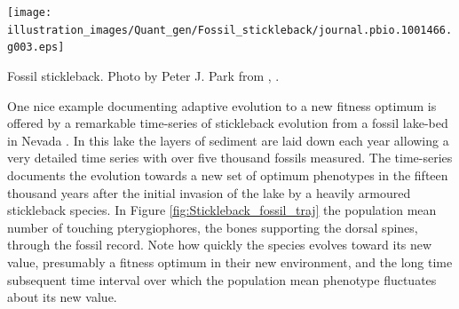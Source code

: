 
\begin{marginfigure}
 \begin{center}
 \texttt{[image: illustration\_images/Quant\_gen/Fossil\_stickleback/journal.pbio.1001466.g003.eps]}
 \end{center}
 \caption{Fossil stickleback. Photo by Peter J. Park from \citet{losos2013evolutionary}, \PLOSccBY.} \label{fig: Stickleback_fossil_traj}  
\end{marginfigure}

One nice example documenting adaptive evolution to a new
fitness optimum is offered by a remarkable time-series of
stickleback evolution from a fossil lake-bed in Nevada \citep{bell2006inferring}. In this lake
the layers of sediment are laid down each year allowing a very detailed
time series with over five thousand fossils measured. The time-series
documents the evolution towards a new set of optimum phenotypes in the
fifteen thousand years after the initial invasion of the lake by a
heavily armoured stickleback species. In Figure \ref{fig:Stickleback_fossil_traj} the population mean number of
touching pterygiophores, the bones supporting the dorsal spines,
through the fossil record. Note how quickly the species evolves toward
its new value, presumably a fitness optimum in their new environment, and the long time subsequent time interval over which
the population mean phenotype fluctuates about its new value.

